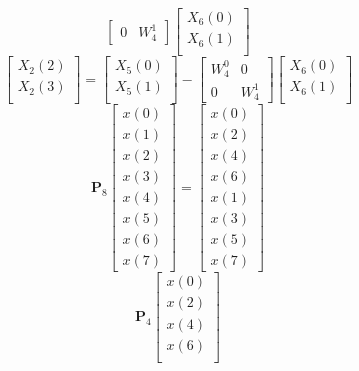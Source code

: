\documentclass[journal,12pt,twocolumn]{IEEEtran}
\let\vec\mathbf
\numberwithin{equation}{section}
\renewcommand\thesection{\arabic{section}}
\begin{document}
\begin{enumerate}[label=\thesection.\arabic*]
\begin{equation}
\begin{bmatrix}
0 & W^{1}_{4}
\end{bmatrix}
\begin{bmatrix}
X_{6}(0) \\ 
X_{6}(1) \\ 
\end{bmatrix}
\end{equation}
\begin{equation}
\begin{bmatrix}
X_{2}(2) \\ 
X_{2}(3)\\ 
\end{bmatrix}
=
\begin{bmatrix}
X_{5}(0) \\ 
X_{5}(1)\\ 
\end{bmatrix}
-
\begin{bmatrix}
W^{0}_{4} & 0\\
0 & W^{1}_{4}
\end{bmatrix}
\begin{bmatrix}
X_{6}(0) \\ 
X_{6}(1) \\ 
\end{bmatrix}
\end{equation}
\begin{equation}
\vec{P}_{8}
\begin{bmatrix}
x(0) \\ 
x(1) \\ 
x(2) \\ 
x(3) \\ 
x(4) \\ 
x(5) \\
x(6) \\
x(7)
\end{bmatrix}
 = 
\begin{bmatrix}
x(0) \\ 
x(2) \\ 
x(4) \\ 
x(6) \\
x(1) \\ 
x(3) \\ 
x(5) \\
x(7)
\end{bmatrix}
\end{equation}
\begin{equation}
\vec{P}_{4}
\begin{bmatrix}
x(0) \\ 
x(2) \\ 
x(4) \\ 
x(6) \\

\end{bmatrix}
\end{equation}
\end{enumerate}
\end{document}
